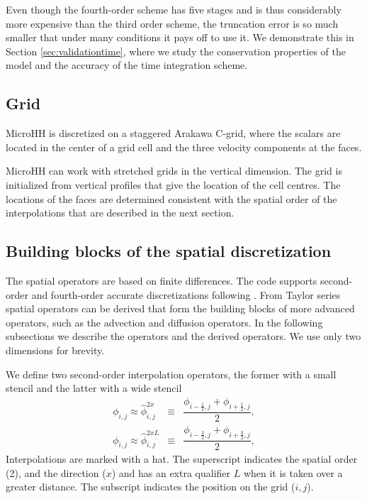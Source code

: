 \documentclass[gmd]{copernicus}
\begin{document}
Even though the fourth-order scheme has five stages and is thus considerably more expensive than the third order scheme, the truncation error is so much smaller that under many conditions it pays off to use it. We demonstrate this in Section \ref{sec:validationtime}, where we study the conservation properties of the model and the accuracy of the time integration scheme.

\subsection{Grid}
MicroHH is discretized on a staggered Arakawa C-grid, where the scalars are located in the center of a grid cell and the three velocity components at the faces.

MicroHH can work with stretched grids in the vertical dimension. The grid is initialized from vertical profiles that give the location of the cell centres. The locations of the faces are determined consistent with the spatial order of the interpolations that are described in the next section.

\subsection{Building blocks of the spatial discretization}
The spatial operators are based on finite differences. The code supports second-order and fourth-order accurate discretizations following \citet{Morinishi1998, Vasilyev2000}. From Taylor series spatial operators can be derived that form the building blocks of more advanced operators, such as the advection and diffusion operators. In the following subsections we describe the operators and the derived operators. We use only two dimensions for brevity.

We define two second-order interpolation operators, the former with a small stencil and the latter with a wide stencil
\begin{eqnarray}
\phi_{i,j} \approx \widehat{\phi}^{2x }_{i,j} & \equiv & \dfrac{\phi_{i-\frac{1}{2},j} + \phi_{i+\frac{1}{2},j}}{2},\\
\phi_{i,j} \approx \widehat{\phi}^{2xL}_{i,j} & \equiv & \dfrac{\phi_{i-\frac{3}{2},j} + \phi_{i+\frac{3}{2},j}}{2},
\end{eqnarray}
Interpolations are marked with a hat. The superscript indicates the spatial order (2), and the direction ($x$) and has an extra qualifier $L$ when it is taken over a greater distance. The subscript indicates the position on the grid ($i,j$).
\end{document}
